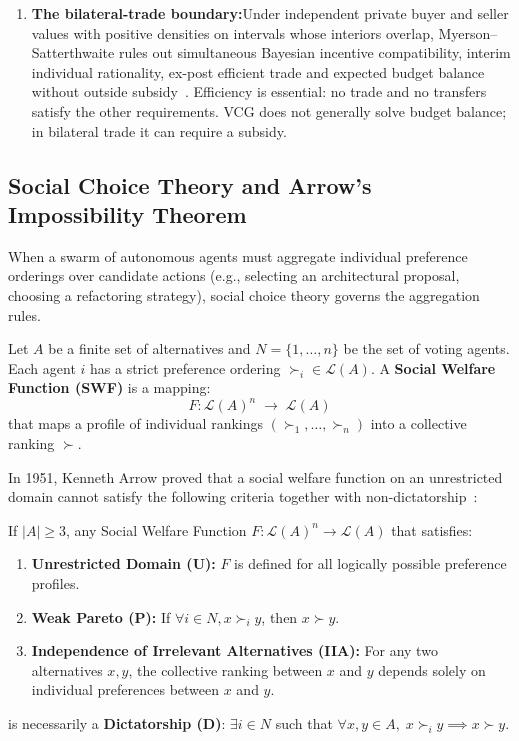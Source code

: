 \begin{enumerate}[leftmargin=1.8em,itemsep=3pt]
  \item \textbf{The bilateral-trade boundary:}\enspace Under independent private buyer and seller values with positive densities on intervals whose interiors overlap, Myerson--Satterthwaite rules out simultaneous Bayesian incentive compatibility, interim individual rationality, ex-post efficient trade and expected budget balance without outside subsidy~. Efficiency is essential: no trade and no transfers satisfy the other requirements. VCG does not generally solve budget balance; in bilateral trade it can require a subsidy.

\end{enumerate}

\subsection{Social Choice Theory and Arrow's Impossibility Theorem}

When a swarm of autonomous agents must aggregate individual preference orderings over candidate actions (e.g., selecting an architectural proposal, choosing a refactoring strategy), social choice theory governs the aggregation rules.

Let $A$ be a finite set of alternatives and $N = \{1, \dots, n\}$ be the set of voting agents. Each agent $i$ has a strict preference ordering $\succ_i \in \mathcal{L}(A)$. A \textbf{Social Welfare Function (SWF)} is a mapping:
\begin{equation}
F: \mathcal{L}(A)^n \;\to\; \mathcal{L}(A)
\end{equation}
that maps a profile of individual rankings $(\succ_1, \dots, \succ_n)$ into a collective ranking $\succ$.

In 1951, Kenneth Arrow proved that a social welfare function on an unrestricted domain cannot satisfy the following criteria together with non-dictatorship~:

\begin{theorem}\label{thm:arrow}
If $|A| \ge 3$, any Social Welfare Function $F: \mathcal{L}(A)^n \to \mathcal{L}(A)$ that satisfies:
\begin{enumerate}[leftmargin=1.5em,itemsep=1.5pt]
  \item \textbf{Unrestricted Domain (U):} $F$ is defined for all logically possible preference profiles.
  \item \textbf{Weak Pareto (P):} If $\forall i \in N, x \succ_i y$, then $x \succ y$.
  \item \textbf{Independence of Irrelevant Alternatives (IIA):} For any two alternatives $x, y$, the collective ranking between $x$ and $y$ depends solely on individual preferences between $x$ and $y$.
\end{enumerate}
is necessarily a \textbf{Dictatorship (D)}: $\exists i \in N$ such that $\forall x, y \in A, \; x \succ_i y \implies x \succ y$.
\end{theorem}

